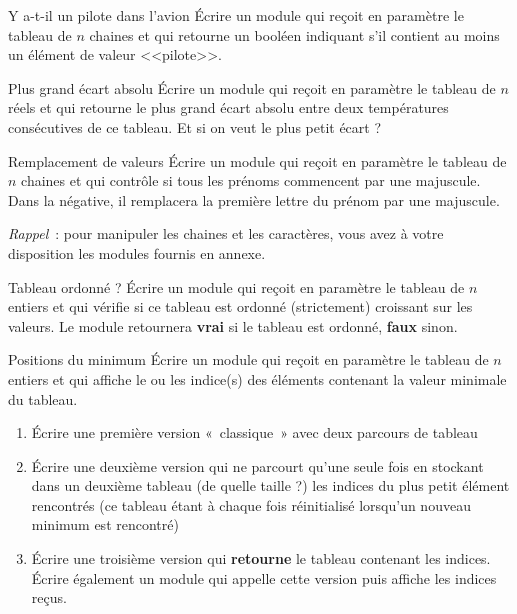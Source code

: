 \begin{Exercice}{Y a-t-il un pilote dans l'avion}
	Écrire un module qui reçoit en paramètre le tableau
	 de $n$ chaines 
	et qui retourne un booléen 
	indiquant s'il contient au moins un élément de 
	valeur <<pilote>>. 
\end{Exercice}

\begin{Exercice}{Plus grand écart absolu}
	Écrire un module qui reçoit en paramètre le tableau
	 de $n$ réels et qui
	retourne le plus grand écart absolu entre deux températures 
	consécutives de ce tableau.
	Et si on veut le plus petit écart ?
\end{Exercice}

\begin{Exercice}{Remplacement de valeurs}
	Écrire un module qui reçoit en paramètre le tableau
	 de $n$ chaines et qui
	contrôle si tous les prénoms commencent par une majuscule.
	Dans la négative, il remplacera la première lettre du prénom 
	par une majuscule.
	
	\textit{Rappel}~: pour manipuler les chaines et les caractères,
	vous avez à votre disposition les modules fournis en annexe.
\end{Exercice}

\begin{Exercice}{Tableau ordonné ?}
	Écrire un module qui reçoit en paramètre le tableau
	 de $n$ entiers et qui
	vérifie si ce tableau est ordonné (strictement) croissant sur les
	valeurs. Le module retournera \textbf{vrai} si le tableau est ordonné,
	\textbf{faux} sinon.
\end{Exercice}

\begin{Exercice}{Positions du minimum}
	Écrire un module qui reçoit en paramètre le tableau
	 de $n$ entiers et qui
	affiche le ou les indice(s) des éléments contenant la valeur minimale
	du tableau.

	\begin{enumerate}[label=\alph*)]
	\item 
		Écrire une première version «~classique~» avec deux parcours de tableau
	\item
		Écrire une deuxième version qui ne parcourt qu’une seule fois 
		 en
		stockant dans un deuxième tableau (de quelle taille ?)
		les indices du plus petit élément
		rencontrés (ce tableau étant à chaque fois réinitialisé lorsqu’un
		nouveau minimum est rencontré)
	\item
		Écrire une troisième version qui \textbf{retourne} 
		le tableau contenant les indices.
		Écrire également un module qui appelle cette version
		puis affiche les indices reçus. 
	\end{enumerate}
\end{Exercice}

